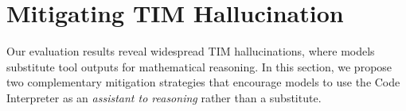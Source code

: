 \documentclass[11pt]{article}
\def \task{\textsc{TIM}\xspace}
\begin{document}



\section{Mitigating \task{} Hallucination}
\label{sec:talm_tuning}
Our evaluation results reveal widespread \task{} hallucinations, where models substitute tool outputs for mathematical reasoning. In this section, we propose two complementary mitigation strategies that encourage models to use the Code Interpreter as an \textit{assistant to reasoning} rather than a substitute.

\end{document}
